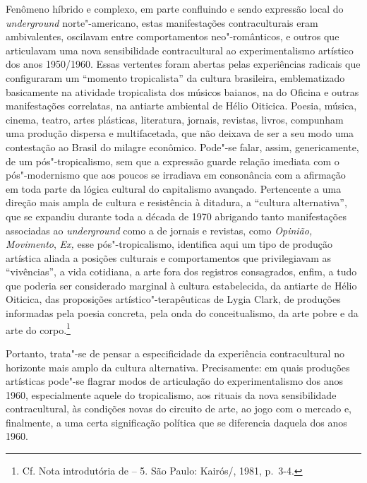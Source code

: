 Fenômeno híbrido e complexo, em parte confluindo e sendo expressão local
do \emph{underground} norte"-americano, estas manifestações
contraculturais eram ambivalentes, oscilavam entre comportamentos
neo"-românticos, e outros que articulavam uma nova sensibilidade
contracultural ao experimentalismo artístico dos anos 1950/1960. Essas
vertentes foram abertas pelas experiências radicais que configuraram um
``momento tropicalista'' da cultura brasileira, emblematizado
basicamente na atividade tropicalista dos músicos baianos, na do Oficina
e outras manifestações correlatas, na antiarte ambiental de Hélio
Oiticica. Poesia, música, cinema, teatro, artes plásticas, literatura,
jornais, revistas, livros, compunham uma produção dispersa e
multifacetada, que não deixava de ser a seu modo uma contestação ao
Brasil do milagre econômico. Pode"-se falar, assim, genericamente, de um
pós"-tropicalismo, sem que a expressão guarde relação imediata com o
pós"-modernismo que aos poucos se irradiava em consonância com a
afirmação em toda parte da lógica cultural do capitalismo avançado.
Pertencente a uma direção mais ampla de cultura e resistência à
ditadura, a ``cultura alternativa'', que se expandiu durante toda a
década de 1970 abrigando tanto manifestações associadas ao
\emph{underground} como a de jornais e revistas, como \emph{Opinião,
Movimento}, \emph{Ex,} esse pós"-tropicalismo, identifica aqui um tipo de
produção artística aliada a posições culturais e comportamentos que
privilegiavam as ``vivências'', a vida cotidiana, a arte fora dos
registros consagrados, enfim, a tudo que poderia ser considerado
marginal à cultura estabelecida, da antiarte de Hélio Oiticica, das
proposições artístico"-terapêuticas de Lygia Clark, de produções
informadas pela poesia concreta, pela onda do conceitualismo, da arte
pobre e da arte do corpo.\footnote{Cf. Nota introdutória de {} -- 5. São Paulo: Kairós/, 1981, p.~3-4.}

Portanto, trata"-se de pensar a especificidade da experiência
contracultural no horizonte mais amplo da cultura alternativa.
Precisamente: em quais produções artísticas pode"-se flagrar modos de
articulação do experimentalismo dos anos 1960, especialmente aquele do
tropicalismo, aos rituais da nova sensibilidade contracultural, às
condições novas do circuito de arte, ao jogo com o mercado e,
finalmente, a uma certa significação política que se diferencia daquela
dos anos 1960.

